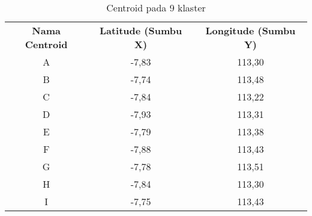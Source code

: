 \begin{table}[H]
\footnotesize
\centering
\begin{tabular}{ccc}
\rowcolor[HTML]{4472C4} 
{\color[HTML]{FFFFFF} \textbf{Nama   Centroid}} & {\color[HTML]{FFFFFF} \textbf{Latitude (Sumbu X)}} & {\color[HTML]{FFFFFF} \textbf{Longitude (Sumbu Y)}} \\
\rowcolor[HTML]{D9E1F2} 
A & -7,83 & 113,30 \\
B & -7,74 & 113,48 \\
\rowcolor[HTML]{D9E1F2} 
C & -7,84 & 113,22 \\
D & -7,93 & 113,31 \\
\rowcolor[HTML]{D9E1F2} 
E & -7,79 & 113,38 \\
F & -7,88 & 113,43 \\
\rowcolor[HTML]{D9E1F2} 
G & -7,78 & 113,51 \\
H & -7,84 & 113,30 \\
\rowcolor[HTML]{D9E1F2} 
I & -7,75 & 113,43 \\                        
\end{tabular}
\caption{Centroid pada 9 klaster}
\label{tab:center9}
\end{table}